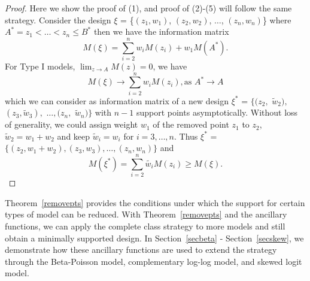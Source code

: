 \documentclass[12pt]{amsart}
\theoremstyle{definition}
\theoremstyle{remark}
\numberwithin{equation}{section}
\begin{document}
\begin{proof}
Here we show the proof of (1), and proof of (2)-(5) will follow the same strategy. Consider the design $\xi$ = \{$(z_1,w_1)$, $(z_2,w_2)$, $\ldots$, $(z_n,w_n)$\} where $A^* = z_1< \ldots< z_n \le B^*$ then we have the information matrix \[M(\xi) =\sum_{i=2}^{n} w_iM(z_i)+w_1M(A^*). \] 
For Type I models,  $\lim_{z\to A}M(z)=0$, we have 
\[
M(\xi) \to\sum_{i=2}^{n} w_iM(z_i),  \text{as } A^* \to A\] which we can consider as information matrix of a new design $\xi^*$ =  $\{(z_2, $ $\tilde{w}_2),$ $ (z_3, \tilde{w}_3),$ $\ldots,(z_{n},$ $\tilde{w}_n) \}$ with $n-1$ support points asymptotically. Without loss of generality, we could assign weight $w_1$ of the removed point $z_1$ to $z_2$, $\tilde{w}_2 = w_1+w_2$ and keep $\tilde{w}_i = w_i$ for $i=3,\ldots,n$. Thus $\xi^*$ =  $\{(z_2, w_1+w_2), (z_3, w_3),\ldots,(z_{n},w_n) \}$ and\[ M(\xi^*) =  \sum_{i=2}^{n} \tilde{w_i}M(z_i)\ge M(\xi).\]




\end{proof}

Theorem~\ref{removepts} provides the conditions under which the support for certain types of model can be reduced. With Theorem~\ref{removepts} and the ancillary functions, we can apply the complete class strategy to more models and still obtain a minimally supported design. In Section~\ref{secbeta} - Section~\ref{secskew}, we demonstrate how these ancillary functions are used to extend the strategy through the Beta-Poisson model, complementary log-log model, and skewed logit model.

 
\end{document}

